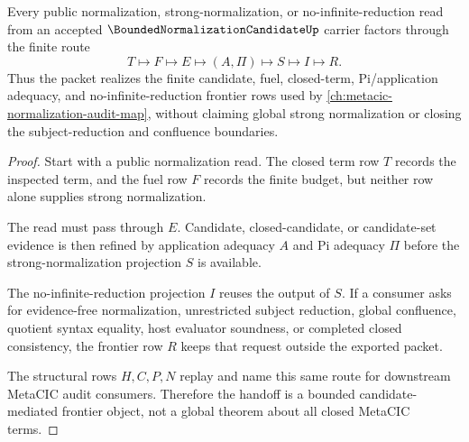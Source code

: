 \begin{theorem}
\label{thm:bounded-normalization-candidate-frontier-handoff}
Every public normalization, strong-normalization, or no-infinite-reduction read from an accepted $\BoundedNormalizationCandidateUp$ carrier factors through the finite route
$$
T \longmapsto F \longmapsto E \longmapsto (A,\Pi) \longmapsto S \longmapsto I \longmapsto R .
$$
Thus the packet realizes the finite candidate, fuel, closed-term, Pi/application adequacy, and no-infinite-reduction frontier rows used by \autoref{ch:metacic-normalization-audit-map}, without claiming global strong normalization or closing the subject-reduction and confluence boundaries.
\end{theorem}
\begin{proof}
Start with a public normalization read. The closed term row $T$ records the inspected term, and the fuel row $F$ records the finite budget, but neither row alone supplies strong normalization.

The read must pass through $E$. Candidate, closed-candidate, or candidate-set evidence is then refined by application adequacy $A$ and Pi adequacy $\Pi$ before the strong-normalization projection $S$ is available.

The no-infinite-reduction projection $I$ reuses the output of $S$. If a consumer asks for evidence-free normalization, unrestricted subject reduction, global confluence, quotient syntax equality, host evaluator soundness, or completed closed consistency, the frontier row $R$ keeps that request outside the exported packet.

The structural rows $H,C,P,N$ replay and name this same route for downstream MetaCIC audit consumers. Therefore the handoff is a bounded candidate-mediated frontier object, not a global theorem about all closed MetaCIC terms.
\end{proof}

